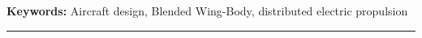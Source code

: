 \begin{vcenterpage}
{\large\textbf{Keywords:}}
Aircraft design, Blended Wing-Body, distributed electric propulsion
\\
\noindent\rule[2pt]{\textwidth}{0.5pt}

%
%

\end{vcenterpage}
